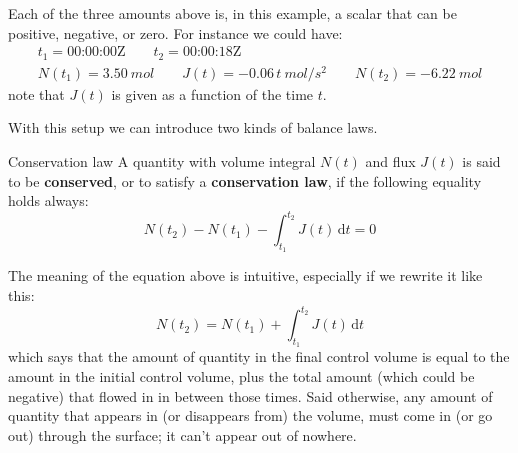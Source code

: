 \documentclass[a4paper,12pt,%
onecolumn,oneside,titlepage,%
british%
]{memoir}
\renewcommand*{\bm}[1]{\textpdfrender{TextRenderingMode=2,LineWidth=0.3pt}{\boldsymbol{#1}}}
\newcommand*{\di}{\mathrm{d}}%
\renewcommand*{\|}[1][]{\nonscript\:#1\vert\nonscript\:\mathopen{}}
\newcommand*{\yN}{N}
\newcommand*{\yJ}{J}
\begin{document}
Each of the three amounts above is, in this example, a scalar that can be positive, negative, or zero. For instance we could have:
\begin{equation*}
  \begin{gathered}
    t_{1} = \text{00:00:00Z}
    \qquad t_{2} = \text{00:00:18Z}
    \\ \yN(t_{1}) = \qty{3.50}{mol}
    \qquad \yJ(t) = -0.06\,t\:\unit{mol/s^{2}}
    \qquad \yN(t_{2}) = \qty{-6.22}{mol}
  \end{gathered}
\end{equation*}
note that $\yJ(t)$ is given as a function of the time $t$.


\smallskip

With this setup we can introduce two kinds of balance laws.

\begin{definition}{Conservation law}
  A quantity with volume integral $\yN(t)$ and flux $\yJ(t)$ is said to be \textbf{conserved}, or to satisfy a \textbf{conservation law}, if the following equality holds always:
  \begin{equation}
    \label{eq:conserved}
    \yN(t_{2}) - \yN(t_{1}) - \int_{t_{1}}^{t_{2}}\!\!\yJ(t)\, \di t = 0
  \end{equation}
\end{definition}
The meaning of the equation above is intuitive, especially if we rewrite it like this:
\begin{equation*}
      \yN(t_{2}) = \yN(t_{1}) + \int_{t_{1}}^{t_{2}}\!\!\yJ(t)\, \di t
\end{equation*}
which says that the amount of quantity in the final control volume is equal to the amount in the initial control volume, plus the total amount (which could be negative) that flowed in in between those times. Said otherwise, any amount of quantity that appears in (or disappears from) the volume, must come in (or go out) through the surface; it can't appear out of nowhere.
\end{document}
